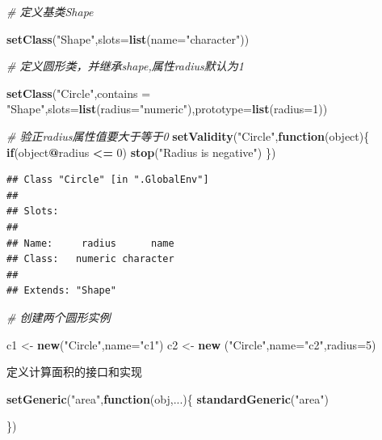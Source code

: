 \documentclass[]{book}
\newenvironment{Shaded}{\begin{snugshade}}{\end{snugshade}}
\newcommand{\KeywordTok}[1]{\textcolor[rgb]{0.13,0.29,0.53}{\textbf{#1}}}
\newcommand{\DataTypeTok}[1]{\textcolor[rgb]{0.13,0.29,0.53}{#1}}
\newcommand{\DecValTok}[1]{\textcolor[rgb]{0.00,0.00,0.81}{#1}}
\newcommand{\StringTok}[1]{\textcolor[rgb]{0.31,0.60,0.02}{#1}}
\newcommand{\CommentTok}[1]{\textcolor[rgb]{0.56,0.35,0.01}{\textit{#1}}}
\newcommand{\ControlFlowTok}[1]{\textcolor[rgb]{0.13,0.29,0.53}{\textbf{#1}}}
\newcommand{\OperatorTok}[1]{\textcolor[rgb]{0.81,0.36,0.00}{\textbf{#1}}}
\newcommand{\NormalTok}[1]{#1}
\begin{document}
\begin{Shaded}
\begin{Highlighting}[]
\CommentTok{# 定义基类Shape}

\KeywordTok{setClass}\NormalTok{(}\StringTok{"Shape"}\NormalTok{,}\DataTypeTok{slots=}\KeywordTok{list}\NormalTok{(}\DataTypeTok{name=}\StringTok{"character"}\NormalTok{))}

\CommentTok{# 定义圆形类，并继承shape,属性radius默认为1}

\KeywordTok{setClass}\NormalTok{(}\StringTok{"Circle"}\NormalTok{,}\DataTypeTok{contains =} \StringTok{"Shape"}\NormalTok{,}\DataTypeTok{slots=}\KeywordTok{list}\NormalTok{(}\DataTypeTok{radius=}\StringTok{"numeric"}\NormalTok{),}\DataTypeTok{prototype=}\KeywordTok{list}\NormalTok{(}\DataTypeTok{radius=}\DecValTok{1}\NormalTok{))}

\CommentTok{# 验正radius属性值要大于等于0}
\KeywordTok{setValidity}\NormalTok{(}\StringTok{"Circle"}\NormalTok{,}\ControlFlowTok{function}\NormalTok{(object)\{}
  \ControlFlowTok{if}\NormalTok{(object}\OperatorTok{@}\NormalTok{radius }\OperatorTok{<=}\StringTok{ }\DecValTok{0}\NormalTok{) }\KeywordTok{stop}\NormalTok{(}\StringTok{"Radius is negative"}\NormalTok{)}
\NormalTok{\})}
\end{Highlighting}
\end{Shaded}

\begin{verbatim}
## Class "Circle" [in ".GlobalEnv"]
## 
## Slots:
##                           
## Name:     radius      name
## Class:   numeric character
## 
## Extends: "Shape"
\end{verbatim}

\begin{Shaded}
\begin{Highlighting}[]
\CommentTok{# 创建两个圆形实例}

\NormalTok{c1 <-}\StringTok{ }\KeywordTok{new}\NormalTok{(}\StringTok{"Circle"}\NormalTok{,}\DataTypeTok{name=}\StringTok{"c1"}\NormalTok{)}
\NormalTok{c2 <-}\StringTok{ }\KeywordTok{new}\NormalTok{ (}\StringTok{"Circle"}\NormalTok{,}\DataTypeTok{name=}\StringTok{"c2"}\NormalTok{,}\DataTypeTok{radius=}\DecValTok{5}\NormalTok{)}
\end{Highlighting}
\end{Shaded}

定义计算面积的接口和实现

\begin{Shaded}
\begin{Highlighting}[]
\KeywordTok{setGeneric}\NormalTok{(}\StringTok{"area"}\NormalTok{,}\ControlFlowTok{function}\NormalTok{(obj,...)\{}
  \KeywordTok{standardGeneric}\NormalTok{(}\StringTok{"area"}\NormalTok{)}
  
\NormalTok{\})}
\end{Highlighting}
\end{Shaded}
\end{document}
